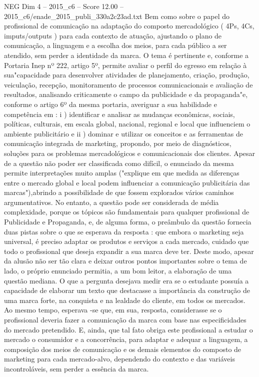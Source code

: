 \begin{textsample}{NEG Dim 4 – 2015\_c6 – Score 12.00 – 2015\_c6/enade\_2015\_publi\_330a2c23ad.txt}
Bem como sobre o papel do profissional de comunicação na adaptação do composto mercadológico ( 4Ps, 4Cs, imputs/outputs ) para cada contexto de atuação, ajustando o plano de comunicação, a linguagem e a escolha dos meios, para cada público a ser atendido, sem perder a identidade da marca.
O tema é pertinente e, conforme a Portaria Inep nº 222, artigo 5º, permite avaliar o perfil do egresso em relação à sua"capacidade para desenvolver atividades de planejamento, criação, produção, veiculação, recepção, monitoramento de processos comunicacionais e avaliação de resultados, analisando criticamente o campo da publicidade e da propaganda"e, conforme o artigo 6º da mesma portaria, averiguar a sua habilidade e competência em : i ) identificar e analisar as mudanças econômicas, sociais, políticas, culturais, em escala global, nacional, regional e local que influenciem o ambiente publicitário e ii ) dominar e utilizar os conceitos e as ferramentas de comunicação integrada de marketing, propondo, por meio de diagnósticos, soluções para os problemas mercadológicos e comunicacionais dos clientes.
Apesar de a questão não poder ser classificada como difícil, o enunciado da mesma permite interpretações muito amplas ("explique em que medida as diferenças entre o mercado global e local podem influenciar a comunicação publicitária das marcas"),abrindo a possibilidade de que fossem explorados vários caminhos argumentativos.
No entanto, a questão pode ser considerada de média complexidade, porque os tópicos são fundamentais para qualquer profissional de Publicidade e Propaganda, e, de alguma forma, o preâmbulo da questão fornecia duas pistas sobre o que se esperava da resposta : que embora o marketing seja universal, é preciso adaptar os produtos e serviços a cada mercado, cuidado que todo o profissional que deseja expandir a sua marca deve ter.
Deste modo, apesar da alusão não ser tão clara e deixar outros pontos importantes sobre o tema de lado, o próprio enunciado permitia, a um bom leitor, a elaboração de uma questão mediana.
O que a pergunta desejava medir era se o estudante possuía a capacidade de elaborar um texto que destacasse a importância da construção de uma marca forte, na conquista e na lealdade do cliente, em todos os mercados.
Ao mesmo tempo, esperava -se que, em sua, resposta, considerasse se o profissional deveria fazer a comunicação da marca com base nas especificidades do mercado pretendido.
E, ainda, que tal fato obriga este profissional a estudar o mercado o consumidor e a concorrência, para adaptar e adequar a linguagem, a composição dos meios de comunicação e os demais elementos do composto de marketing para cada mercado-alvo, dependendo do contexto e das variáveis incontroláveis, sem perder a essência da marca.

\end{textsample}
